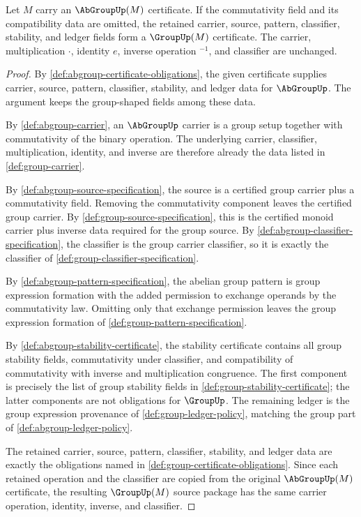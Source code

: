 \begin{proposition}
\label{prop:abgroup-forgets-group-certificate}
Let $M$ carry an $\AbGroupUp(M)$ certificate. If the commutativity field and its compatibility data are omitted, the retained carrier, source, pattern, classifier, stability, and ledger fields form a $\GroupUp(M)$ certificate. The carrier, multiplication $\cdot$, identity $e$, inverse operation ${}^{-1}$, and classifier are unchanged.
\end{proposition}
\begin{proof}
By \autoref{def:abgroup-certificate-obligations}, the given certificate supplies carrier, source, pattern, classifier, stability, and ledger data for $\AbGroupUp$. The argument keeps the group-shaped fields among these data.

By \autoref{def:abgroup-carrier}, an $\AbGroupUp$ carrier is a group setup together with commutativity of the binary operation. The underlying carrier, classifier, multiplication, identity, and inverse are therefore already the data listed in \autoref{def:group-carrier}.

By \autoref{def:abgroup-source-specification}, the source is a certified group carrier plus a commutativity field. Removing the commutativity component leaves the certified group carrier. By \autoref{def:group-source-specification}, this is the certified monoid carrier plus inverse data required for the group source. By \autoref{def:abgroup-classifier-specification}, the classifier is the group carrier classifier, so it is exactly the classifier of \autoref{def:group-classifier-specification}.

By \autoref{def:abgroup-pattern-specification}, the abelian group pattern is group expression formation with the added permission to exchange operands by the commutativity law. Omitting only that exchange permission leaves the group expression formation of \autoref{def:group-pattern-specification}.

By \autoref{def:abgroup-stability-certificate}, the stability certificate contains all group stability fields, commutativity under classifier, and compatibility of commutativity with inverse and multiplication congruence. The first component is precisely the list of group stability fields in \autoref{def:group-stability-certificate}; the latter components are not obligations for $\GroupUp$. The remaining ledger is the group expression provenance of \autoref{def:group-ledger-policy}, matching the group part of \autoref{def:abgroup-ledger-policy}.

The retained carrier, source, pattern, classifier, stability, and ledger data are exactly the obligations named in \autoref{def:group-certificate-obligations}. Since each retained operation and the classifier are copied from the original $\AbGroupUp(M)$ certificate, the resulting $\GroupUp(M)$ source package has the same carrier operation, identity, inverse, and classifier.
\end{proof}
